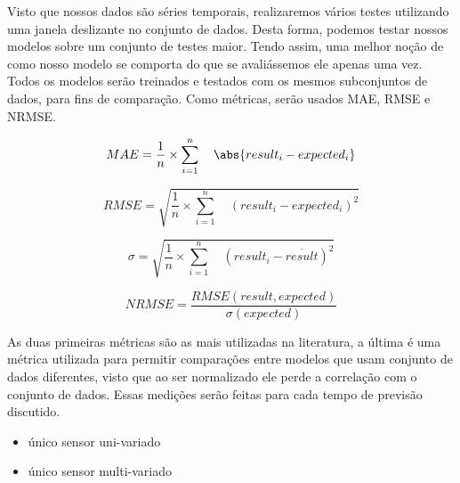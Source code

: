 


Visto que nossos dados são séries temporais, realizaremos vários testes utilizando uma janela deslizante no conjunto de dados. Desta forma, podemos testar nossos modelos sobre um conjunto de testes maior. Tendo assim, uma melhor noção de como nosso modelo se comporta do que se avaliássemos ele apenas uma vez. Todos os modelos serão treinados e testados com os mesmos subconjuntos de dados, para fins de comparação. Como métricas, serão usados MAE, RMSE e NRMSE. 

\begin{equation}
MAE = \frac{1}{n} \times \sum_{i=1}^{n} \quad \abs{result_i - expected_i}
\end{equation}

\begin{equation}
RMSE = \sqrt{ \frac{1}{n} \times \sum_{i=1}^{n} \quad (result_i - expected_i) ^ 2}
\end{equation}

\begin{equation}
\sigma = \sqrt{ \frac{1}{n} \times \sum_{i=1}^{n} \quad (result_i - \overline{result}) ^ 2}
\end{equation}

\begin{equation}
NRMSE = \frac{RMSE(result, expected)}{\sigma(expected)}
\end{equation}

As duas primeiras métricas são as mais utilizadas na literatura, a última é uma métrica utilizada para permitir comparações entre modelos que usam conjunto de dados diferentes, visto que ao ser normalizado ele perde a correlação com o conjunto de dados. Essas medições serão feitas para cada tempo de previsão discutido.

\begin{itemize}
    \item único sensor uni-variado
    \item único sensor multi-variado
\end{itemize}
